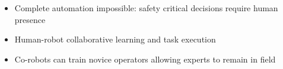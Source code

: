 \documentclass[portrait,a0paper,fontscale=0.28]{baposter} %
\begin{document}
\begin{poster}
{  
    \begin{itemize}
    \item Complete automation impossible: safety critical decisions require human presence
    \item
      Human-robot collaborative learning and task execution
    \item
      Co-robots can train novice operators allowing experts to remain in field
    \end{itemize}
  
  
  
  
  
  
}



\end{poster}
\end{document}
